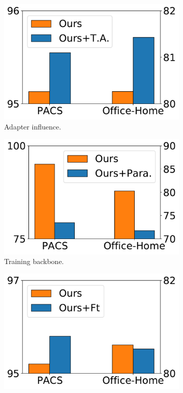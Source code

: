\documentclass[11pt]{article}
\begin{document}
\begin{figure}[t!]
	\centering
	\begin{subfigure}[b]{0.24\textwidth}
		\centering
		\includegraphics[width=\textwidth]{fig/moreada.pdf}
		\caption{Adapter influence.}
		\label{fig:anly1}
	\end{subfigure}
    \begin{subfigure}[b]{0.24\textwidth}
		\centering
		\includegraphics[width=\textwidth]{fig/morePara.pdf}
		\caption{Training backbone.}
		\label{fig:anly2}
	\end{subfigure}
 	\begin{subfigure}[b]{0.24\textwidth}
		\centering
		\includegraphics[width=\textwidth]{fig/moreft.pdf}

\end{subfigure}
\end{figure}
\end{document}
